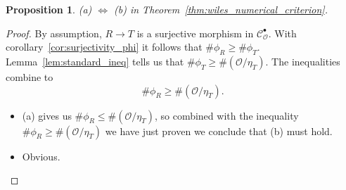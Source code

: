 \documentclass{article}
\theoremstyle{plain}%
\newtheorem{proposition}{Proposition}[section]
\theoremstyle{definition}
\theoremstyle{remark}
\newcommand{\cob}{\mathcal{C}_\mathcal{O}^\bullet}
\begin{document}
    \begin{proposition}
        (a) \(\Leftrightarrow\) (b) in Theorem~\ref{thm:wiles_numerical_criterion}.
    \end{proposition}
    \begin{proof}
        By assumption, \(R \to T\) is a surjective morphism in \(\cob\).
        With corollary~\ref{cor:surjectivity_phi} it follows that \(\#\phi_R \geq \#\phi_T\).
        Lemma~\ref{lem:standard_ineq} tells us that \(\#\phi_T \geq \#(\mathcal{O}/\eta_T)\).
        The inequalities combine to \[\#\phi_R \geq \#(\mathcal{O}/\eta_T).\]
        \begin{itemize}
            \item[(a)\(\implies\)(b)] (a) gives us \(\#\phi_R \leq \#(\mathcal{O}/\eta_T)\), so combined with the 
            inequality \(\#\phi_R \geq \#(\mathcal{O}/\eta_T)\) we have just proven we conclude that (b) must hold.
            \item[(b)\(\implies\)(a)] Obvious.
        \end{itemize}      
    \end{proof}
\end{document}
